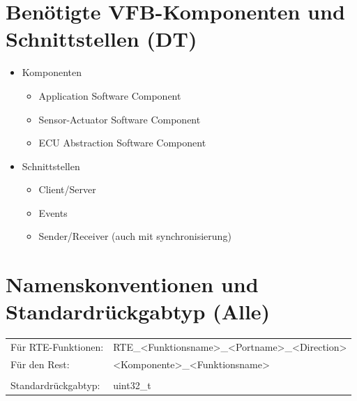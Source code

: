 \documentclass[a4paper,11pt]{scrreprt}
\begin{document}
\section{Benötigte VFB-Komponenten und Schnittstellen (DT)}

\begin{itemize}
 \item Komponenten
 \begin{itemize}
  \item Application Software Component
  \item Sensor-Actuator Software Component
  \item ECU Abstraction Software Component
 \end{itemize}

 \item Schnittstellen
 \begin{itemize}
  \item Client/Server
  \item Events
  \item Sender/Receiver (auch mit synchronisierung)
 \end{itemize}

\end{itemize}


\section{Namenskonventionen und Standardrückgabtyp (Alle)}

\begin{tabular}{ll}
 Für RTE-Funktionen: & RTE\_<Funktionsname>\_<Portname>\_<Direction> \\
 Für den Rest: & <Komponente>\_<Funktionsname> \\
 \\
 Standardrückgabtyp: & uint32\_t \\
\end{tabular}
\end{document}
